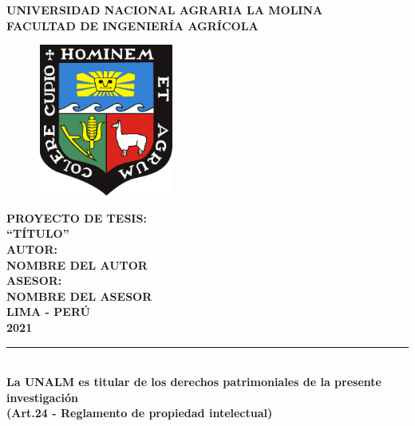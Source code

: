 \begin{titlepage}
\centering
 {\fontsize{18pt}{ \baselineskip}\selectfont \textbf{UNIVERSIDAD NACIONAL AGRARIA LA MOLINA}}\\[0.25cm]
 {\fontsize{16pt}{ \baselineskip}\selectfont \textbf{FACULTAD DE INGENIERÍA AGRÍCOLA}}\\[1cm]
\begin{figure}[htb]
\centering
\includegraphics[width=4.5cm, height=5cm]{Cover/Escudo_UNALM.pdf}
\end{figure}
\vspace{0.5cm}
{\fontsize{14pt}{ \baselineskip}\selectfont \textbf{PROYECTO DE TESIS:}}\\[0.5cm]
{\fontsize{14pt}{ \baselineskip}\selectfont \textbf{``TÍTULO''}}\\[0.5cm]
{\fontsize{14pt}{ \baselineskip}\selectfont \textbf{AUTOR:}}\\[0.5cm]
{\fontsize{14pt}{ \baselineskip}\selectfont \textbf{NOMBRE DEL AUTOR}}\\[0.5cm]
{\fontsize{14pt}{ \baselineskip}\selectfont \textbf{ASESOR:}}\\[0.5cm]
{\fontsize{14pt}{ \baselineskip}\selectfont \textbf{NOMBRE DEL ASESOR}}\\[0.5cm]
\vfill
{\fontsize{14pt}{ \baselineskip}\selectfont \textbf{LIMA - PERÚ}}\\[0.5cm]
{\fontsize{14pt}{ \baselineskip}\selectfont \textbf{2021}}
\singlespacing
\rule{132mm}{0.25mm}\\
{\small \textbf{La UNALM es titular de los derechos patrimoniales de la presente investigación\\ (Art.24 - Reglamento de propiedad intelectual)}}
\end{titlepage}
\restoregeometry

